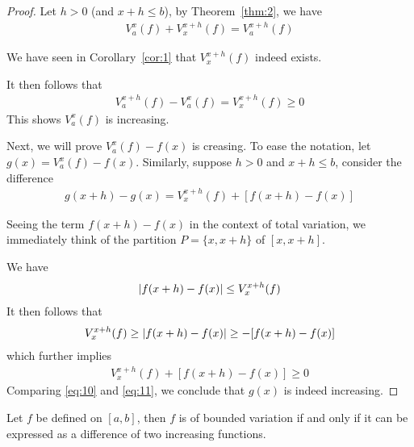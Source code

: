 \documentclass[thmcnt=section, color=blue, 12pt]{my-elegantbook}
\begin{document}
\begin{proof}
	Let $h > 0$ (and $x + h \leq b$), by Theorem~\ref{thm:2}, we have
	\begin{align*}
		V_a^x (f) + V_x^{x+h} (f) = V_a^{x+h} (f)
	\end{align*}
	\begin{note}
		We have seen in Corollary~\ref{cor:1} that $V_x^{x+h}(f)$ indeed exists.
	\end{note}
	It then follows that
	\begin{align*}
		V_a^{x+h}(f) - V_a^{x}(f) = V_x^{x+h}(f) \geq 0
	\end{align*}
	This shows $V_a^x(f)$ is increasing.

	Next, we will prove $V_a^x(f) - f(x)$ is creasing.
	To ease the notation, let $g(x) = V_a^x(f) - f(x)$.
	Similarly, suppose $h > 0$ and $x + h \leq b$,
	consider the difference
	\begin{align}
		g(x+h) - g(x)
		= V_x^{x+h}(f) + [f(x+h) - f(x)]
		\label{eq:10}
	\end{align}
	\begin{note}
		Seeing the term $f(x+h) - f(x)$ in the context of total variation,
		we immediately think of the partition $P = \{x, x+h\}$ of $[x, x+h]$.
	\end{note}
	We have
	\begin{align*}
		\left\lvert f(x+h) - f(x) \right\rvert \leq V_x^{x+h}(f)
	\end{align*}
	It then follows that
	\begin{align*}
		V_x^{x+h}(f) \geq \left\lvert f(x+h) - f(x) \right\rvert \geq -[f(x+h) - f(x)]
	\end{align*}
	which further implies
	\begin{align}
		V_x^{x+h}(f) + [f(x+h) - f(x)] \geq 0
		\label{eq:11}
	\end{align}
	Comparing \eqref{eq:10} and \eqref{eq:11}, we conclude
	that $g(x)$ is indeed increasing.
\end{proof}

\begin{theorem} \label{thm:4}
	Let $f$ be defined on $[a, b]$,
	then $f$ is of bounded variation if and only if
	it can be expressed as a difference of two
	increasing functions.
\end{theorem}


\printbibliography[heading=bibintoc, title=References]


\printindex
\end{document}
